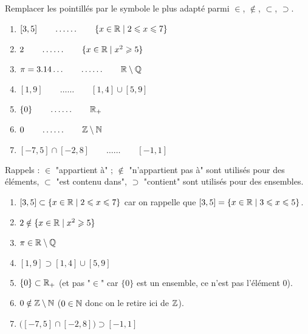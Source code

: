 \documentclass[11pt,class=report,crop=false]{standalone}
\begin{document}


\bigskip
\bigskip


\exercice{}
\enonce
Remplacer les pointillés par le symbole le plus adapté parmi $\in$, $\notin$, $\subset$, $\supset$.

\begin{enumerate}
    \item $ [3,5] \qquad \ldots\ldots \qquad \{ x \in \mathbb{R} \mid 2 \leqslant x \leqslant 7 \} $
    \item $ 2 \qquad \ldots\ldots \qquad \{ x \in \mathbb{R} \mid x^2 \geqslant 5 \} $
    \item $\pi = 3.14\dots  \qquad \ldots\ldots \qquad \mathbb{R} \setminus \mathbb{Q} $
    \item $[1,9] \qquad \ldots\ldots \qquad [1,4] \cup [5,9] $
    \item $\{ 0 \} \qquad \ldots\ldots \qquad \mathbb{R}_+$
    \item $0 \qquad \ldots\ldots \qquad \mathbb{Z} \setminus \mathbb{N} $   
    \item $[-7,5] \cap [-2,8] \qquad \ldots\ldots \qquad [-1,1] $  
\end{enumerate}    
\finenonce

\indication
Rappels :
$\in$ "appartient à" ; $\notin$ "n'appartient pas à" sont utilisés pour des éléments, $\subset$ "est contenu dans", $\supset$ "contient" sont utilisés pour des ensembles.
\finindication

\correction
\sauteligne
\begin{enumerate}
    \item $ [3,5] \subset \{ x \in \mathbb{R} \mid 2 \leqslant x \leqslant 7 \} $ car on rappelle que 
    $ [3,5] = \{ x \in \mathbb{R} \mid 3 \leqslant x \leqslant 5 \} $.

    \item $ 2 \notin \{ x \in \mathbb{R} \mid x^2 \geqslant 5 \} $
    
    \item $\pi  \in  \mathbb{R} \setminus \mathbb{Q} $
    
    \item $[1,9] \supset [1,4] \cup [5,9] $
    
    \item $\{ 0 \} \subset \mathbb{R}_+$ (et pas "$\in$" car $\{ 0 \}$ est un ensemble, ce n'est pas l'élément $0$). 

    \item $0 \notin \mathbb{Z} \setminus \mathbb{N} $ ($0 \in \mathbb{N}$ donc on le retire ici de $\mathbb{Z}$).
    
    \item $\big([-7,5] \cap [-2,8]\big) \supset [-1,1]$  
\end{enumerate}  
\fincorrection
\finexercice
\end{document}
